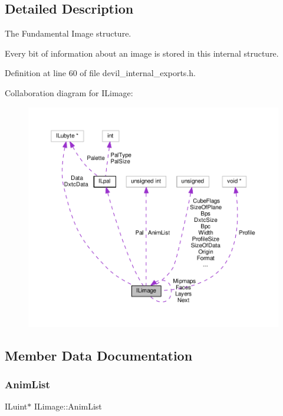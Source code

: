 \subsection{Detailed Description}
The Fundamental Image structure. 

Every bit of information about an image is stored in this internal structure. 

Definition at line 60 of file devil\+\_\+internal\+\_\+exports.\+h.



Collaboration diagram for I\+Limage\+:
\nopagebreak
\begin{figure}[H]
\begin{center}
\leavevmode
\includegraphics[width=350pt]{d9/d40/structILimage__coll__graph}
\end{center}
\end{figure}


\subsection{Member Data Documentation}
\mbox{\label{structILimage_ab128f3c35d0617202e3ec8252af5fa03}} 
\subsubsection{\texorpdfstring{Anim\+List}{AnimList}}
{\footnotesize\ttfamily I\+Luint$\ast$ I\+Limage\+::\+Anim\+List}



